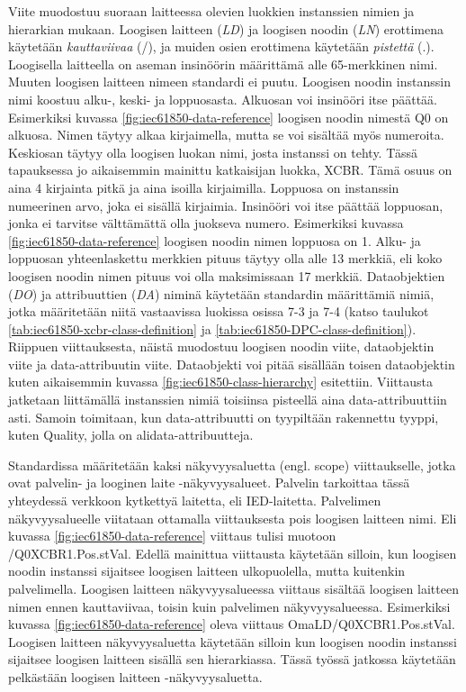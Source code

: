 Viite muodostuu suoraan laitteessa olevien luokkien instanssien nimien ja hierarkian mukaan. Loogisen laitteen (\emph{LD}) ja loogisen noodin (\emph{LN}) erottimena käytetään \emph{kauttaviivaa} (/), ja muiden osien erottimena käytetään \emph{pistettä} (.). Loogisella laitteella on aseman insinöörin määrittämä alle 65-merkkinen nimi. Muuten loogisen laitteen nimeen standardi ei puutu. Loogisen noodin instanssin nimi koostuu alku-, keski- ja loppuosasta. Alkuosan voi insinööri itse päättää. Esimerkiksi kuvassa \ref{fig:iec61850-data-reference} loogisen noodin nimestä Q0 on alkuosa. Nimen täytyy alkaa kirjaimella, mutta se voi sisältää myös numeroita. Keskiosan täytyy olla loogisen luokan nimi, josta instanssi on tehty. Tässä tapauksessa jo aikaisemmin mainittu katkaisijan luokka, XCBR. Tämä osuus on aina 4 kirjainta pitkä ja aina isoilla kirjaimilla. Loppuosa on instanssin numeerinen arvo, joka ei sisällä kirjaimia. Insinööri voi itse päättää loppuosan, jonka ei tarvitse välttämättä olla juokseva numero. Esimerkiksi kuvassa \ref{fig:iec61850-data-reference} loogisen noodin nimen loppuosa on 1. 
Alku- ja loppuosan yhteenlaskettu merkkien pituus täytyy olla alle 13 merkkiä, eli koko loogisen noodin nimen pituus voi olla maksimissaan 17 merkkiä. Dataobjektien (\emph{DO}) ja attribuuttien (\emph{DA}) niminä käytetään standardin määrittämiä nimiä, jotka määritetään niitä vastaavissa luokissa osissa 7-3 ja 7-4 (katso taulukot \ref{tab:iec61850-xcbr-class-definition} ja \ref{tab:iec61850-DPC-class-definition}). Riippuen viittauksesta, näistä muodostuu loogisen noodin viite, dataobjektin viite ja data-attribuutin viite. Dataobjekti voi pitää sisällään toisen dataobjektin kuten aikaisemmin kuvassa \ref{fig:iec61850-class-hierarchy} esitettiin. Viittausta jatketaan liittämällä instanssien nimiä toisiinsa pisteellä aina data-attribuuttiin asti. Samoin toimitaan, kun data-attribuutti on tyypiltään rakennettu tyyppi, kuten Quality, jolla on alidata-attribuutteja. \mbox{\cite[s.~181--182]{IEC61850-7-2}} \mbox{\cite[s.~93--95]{IEC61850-7-1}}

Standardissa määritetään kaksi näkyvyysaluetta (engl. scope) viittaukselle, jotka ovat palvelin- ja looginen laite -näkyvyysalueet. Palvelin tarkoittaa tässä yhteydessä verkkoon kytkettyä laitetta, eli IED-laitetta. Palvelimen näkyvyysalueelle viitataan ottamalla viittauksesta pois loogisen laitteen nimi. Eli kuvassa \ref{fig:iec61850-data-reference} viittaus tulisi muotoon /Q0XCBR1.\-Pos.\-stVal. Edellä mainittua viittausta käytetään silloin, kun loogisen noodin instanssi sijaitsee loogisen laitteen ulkopuolella, mutta kuitenkin palvelimella. Loogisen laitteen näkyvyysalueessa viittaus sisältää loogisen laitteen nimen ennen kauttaviivaa, toisin kuin palvelimen näkyvyysalueessa. Esimerkiksi kuvassa \ref{fig:iec61850-data-reference} oleva viittaus OmaLD/\-Q0XCBR1.\-Pos.\-stVal. Loogisen laitteen näkyvyysaluetta käytetään silloin kun loogisen noodin instanssi sijaitsee loogisen laitteen sisällä sen hierarkiassa. Tässä työssä jatkossa käytetään pelkästään loogisen laitteen -näkyvyysaluetta. \mbox{\cite[s.~183]{IEC61850-7-2}}

